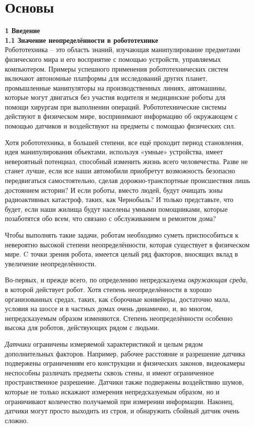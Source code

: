 \documentclass[10pt,a4paper]{article}
\begin{document}
\part{Основы}

\textbf{\Large1 Введение}\\

\textbf{1.1 Значение неопределённости в робототехнике}\\

Робототехника – это область знаний, изучающая   манипулирование предметами физического мира и его восприятие с помощью устройств, управляемых компьютером. Примеры успешного применения робототехнических систем включают автономные платформы для исследований других планет, промышленные манипуляторы на производственных линиях, автомашины, которые могут двигаться без участия водителя и медицинские роботы для помощи хирургам при выполнении операций. Робототехнические системы действуют в физическом мире, воспринимают информацию об окружающем с помощью датчиков и воздействуют на предметы с помощью физических сил.

Хотя робототехника, в большей степени, все ещё проходит период становления, идея манипулирования объектами, используя «умные» устройства, имеет невероятный потенциал, способный изменить жизнь всего человечества. Разве не станет лучше, если все наши автомобили приобретут возможность безопасно передвигаться самостоятельно, сделав дорожно-транспортные происшествия лишь достоянием истории? И если роботы, вместо людей, будут очищать зоны радиоактивных катастроф, таких, как Чернобыль?
И только представьте, что будет, если наши жилища будут населены умными помощниками, которые позаботятся обо всем, что связано с обслуживанием и ремонтом дома? 

Чтобы выполнять такие задачи, роботам необходимо суметь приспособиться к невероятно высокой степени неопределённости, которая существует в физическом мире. C точки зрения робота, имеется целый ряд факторов, вносящих вклад в увеличение неопределённости.

Во-первых, и прежде всего, по определению непредсказуема \textit{окружающая среда}, в которой действует робот. Хотя степень неопределённости в хорошо организованных средах, таких, как сборочные конвейеры, достаточно мала, условия на шоссе и в частных домах очень динамично, и, во многом, непредсказуемым образом изменяются. Степень неопределённости особенно высока для роботов, действующих рядом с людьми.

\textit{Датчики} ограничены измеряемой характеристикой и целым рядом дополнительных факторов. Например, рабочее расстояние и разрешение датчика подвержены  ограничениям его конструкции и физических законов, видеокамеры неспособны различать предметы сквозь стены, и имеют ограниченное пространственное разрешение. Датчики также подвержены воздействию шумов, которые не только искажают измерения непредсказуемым образом, но и ограничивают количество получаемой при измерении информации. Наконец, датчики могут просто выходить из строя, и обнаружить сбойный датчик очень сложно.
\end{document}
